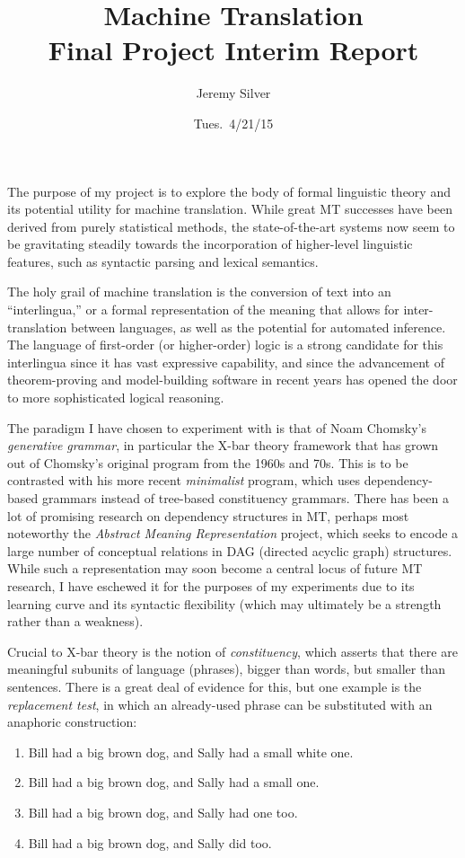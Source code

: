 \documentclass[11pt, oneside]{article}      %
\title{Machine Translation \\ Final Project Interim Report}
\author{Jeremy Silver}
\date{Tues.\ 4/21/15}                          %
\begin{document}
\maketitle

The purpose of my project is to explore the body of formal linguistic theory and its potential utility for machine translation.  While great MT successes have been derived from purely statistical methods, the state-of-the-art systems now seem to be gravitating steadily towards the incorporation of higher-level linguistic features, such as syntactic parsing and lexical semantics.  

The holy grail of machine translation is the conversion of text into an ``interlingua,'' or a formal representation of the meaning that allows for inter-translation between languages, as well as the potential for automated inference.  The language of first-order (or higher-order) logic is a strong candidate for this interlingua since it has vast expressive capability, and since the advancement of theorem-proving and model-building software in recent years has opened the door to more sophisticated logical reasoning.

The paradigm I have chosen to experiment with is that of Noam Chomsky's \textit{generative grammar}, in particular the X-bar theory framework that has grown out of Chomsky's original program from the 1960s and 70s.  This is to be contrasted with his more recent \textit{minimalist} program, which uses dependency-based grammars instead of tree-based constituency grammars.  There has been a lot of promising research on dependency structures in MT, perhaps most noteworthy the \textit{Abstract Meaning Representation} project, which seeks to encode a large number of conceptual relations in DAG (directed acyclic graph) structures.  While such a representation may soon become a central locus of future MT research, I have eschewed it for the purposes of my experiments due to its learning curve and its syntactic flexibility (which may ultimately be a strength rather than a weakness).

Crucial to X-bar theory is the notion of \textit{constituency}, which asserts that there are meaningful subunits of language (phrases), bigger than words, but smaller than sentences.  There is a great deal of evidence for this, but one example is the \textit{replacement test}, in which an already-used phrase can be substituted with an anaphoric construction:

\begin{enumerate}
\item Bill had a big brown dog, and Sally had a small white one.
\item Bill had a big brown dog, and Sally had a small one.
\item Bill had a big brown dog, and Sally had one too.
\item Bill had a big brown dog, and Sally did too.
\end{enumerate}
\end{document}
